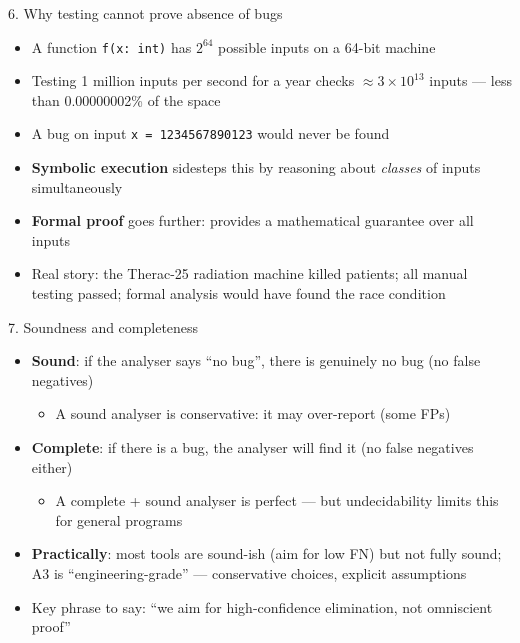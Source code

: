 \documentclass[aspectratio=169]{beamer}
\begin{document}
\begin{frame}{6. Why testing cannot prove absence of bugs}
\begin{itemize}
  \item A function \texttt{f(x: int)} has \(2^{64}\) possible inputs on a 64-bit machine
  \item Testing 1 million inputs per second for a year checks \(\approx 3 \times 10^{13}\) inputs ---
    less than 0.00000002\% of the space
  \item A bug on input \texttt{x = 1234567890123} would never be found
  \item \textbf{Symbolic execution} sidesteps this by reasoning about \emph{classes} of inputs simultaneously
  \item \textbf{Formal proof} goes further: provides a mathematical guarantee over all inputs
  \item Real story: the Therac-25 radiation machine killed patients; all manual testing passed; formal analysis would have found the race condition
\end{itemize}
\end{frame}

\begin{frame}{7. Soundness and completeness}
\begin{itemize}
  \item \textbf{Sound}: if the analyser says ``no bug'', there is genuinely no bug (no false negatives)
    \begin{itemize}
      \item A sound analyser is conservative: it may over-report (some FPs)
    \end{itemize}
  \item \textbf{Complete}: if there is a bug, the analyser will find it (no false negatives either)
    \begin{itemize}
      \item A complete + sound analyser is perfect --- but undecidability limits this for general programs
    \end{itemize}
  \item \textbf{Practically}: most tools are sound-ish (aim for low FN) but not fully sound; A3 is
    ``engineering-grade'' --- conservative choices, explicit assumptions
  \item Key phrase to say: ``we aim for high-confidence elimination, not omniscient proof''
\end{itemize}
\end{frame}
\end{document}
